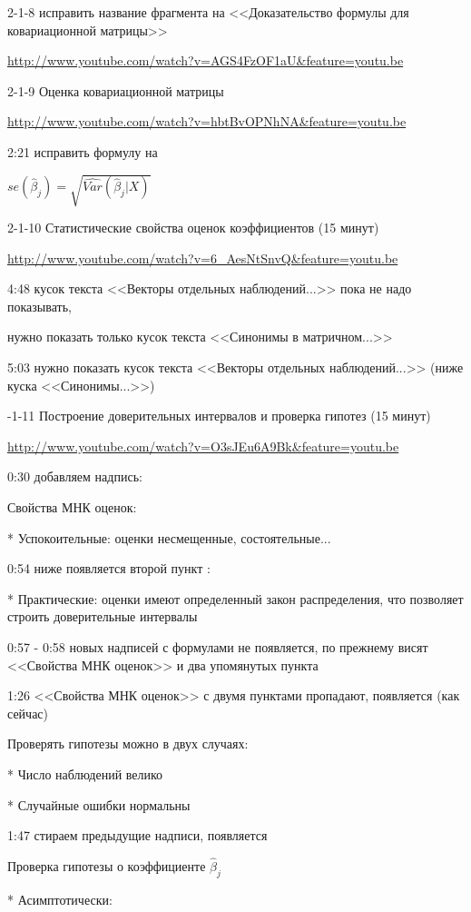 \documentclass[12pt,a4paper]{article}
\begin{document}
2-1-8 исправить название фрагмента  на  <<Доказательство формулы для ковариационной матрицы>>

\url{http://www.youtube.com/watch?v=AGS4FzOF1aU&feature=youtu.be}

 

2-1-9 Оценка ковариационной матрицы %

\url{http://www.youtube.com/watch?v=hbtBvOPNhNA&feature=youtu.be}

2:21 исправить формулу на

$se(\hat{\beta}_j)=\sqrt{\widehat{Var}(\hat{\beta}_j | X)}$

2-1-10 Статистические свойства оценок коэффициентов (15 минут)

\url{http://www.youtube.com/watch?v=6_AesNtSnvQ&feature=youtu.be}

4:48 кусок текста <<Векторы отдельных наблюдений...>> пока не надо показывать,

нужно показать только кусок текста <<Синонимы в матричном...>> 

5:03 нужно показать кусок текста <<Векторы отдельных наблюдений...>> (ниже куска <<Синонимы...>>)

-1-11 Построение доверительных интервалов и проверка гипотез (15 минут)

\url{http://www.youtube.com/watch?v=O3sJEu6A9Bk&feature=youtu.be}

0:30 добавляем надпись:

Свойства МНК оценок:

* Успокоительные: оценки несмещенные, состоятельные...

0:54 ниже появляется второй пункт :

* Практические: оценки имеют определенный закон распределения, что позволяет строить доверительные интервалы

0:57 - 0:58 новых надписей с формулами не появляется,
по прежнему висят <<Свойства МНК оценок>> и два упомянутых пункта

1:26 <<Свойства МНК оценок>> с двумя пунктами пропадают, появляется (как сейчас)

Проверять гипотезы можно в двух случаях:

* Число наблюдений велико

* Случайные ошибки нормальны

1:47 стираем предыдущие надписи, появляется

Проверка гипотезы о коэффициенте $\hat{\beta}_j$

* Асимптотически: 
\end{document}
